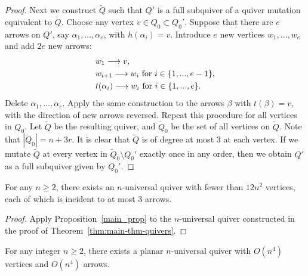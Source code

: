 \begin{proof}
Next we construct $\widetilde{Q}$ such that $Q'$ is a full subquiver of a quiver mutation equivalent to $\widetilde{Q}$.
Choose any vertex $v\in Q_0\subset Q_0'$. Suppose that there are $e$ arrows on $Q'$, say $\alpha_1,...,\alpha_e$, with $h(\alpha_i)=v$. Introduce $e$ new vertices $w_1,...,w_e$ and add $2e$ new arrows:
$$\aligned
&w_1\longrightarrow v,\\
&w_{i+1}\longrightarrow w_i\text{ for }i\in\{1,...,e-1\},\\
&t(\alpha_i)\longrightarrow w_i\text{ for }i\in\{1,...,e\}.
\endaligned$$ 
Delete $\alpha_1,...,\alpha_e$. Apply the same construction to the arrows $\beta$ with $t(\beta)=v$, with the direction of new arrows reversed. Repeat this procedure for all vertices in $Q_0$. Let $\widetilde{Q}$ be the resulting quiver, and $\widetilde{Q}_0$ be the set of all vertices on $\widetilde{Q}$. Note that $|\widetilde{Q}_0|=n+3r$. It is clear that $\widetilde{Q}$ is of degree at most 3 at each vertex. If we mutate $\widetilde{Q}$ at every vertex in $ \widetilde{Q}_0\setminus Q_0'$ exactly once in any order, then we obtain $Q'$ as a full subquiver given by $Q_0'$.
\fi
\end{proof}

\begin{corollary}
\label{main_thm2}
For any $n\ge 2$, there exists an $n$-universal quiver with fewer than $12n^2$ vertices, each of which is incident to at most 3 arrows. 
\end{corollary}

\begin{proof}
Apply Proposition~\ref{main_prop} to the $n$-universal quiver constructed in the proof of Theorem~\ref{thm:main-thm-quivers}.
\end{proof}

\begin{theorem}
\label{thm:planar-universal}
For any integer $n\ge 2$, there exists a planar $n$-universal quiver with $O(n^4)$ vertices and $O(n^4)$ arrows. 
\end{theorem}

